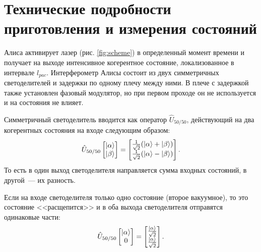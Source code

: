 \section[Технические подробности]{Технические подробности приготовления и измерения состояний}
Алиса активирует лазер (рис. \ref{fig:scheme}) в определенный момент времени и получает на выходе интенсивное когерентное состояние, локализованное в интервале $l_{pac}$. 
Интерферометр Алисы состоит из двух симметричных светоделителей и задержки по одному плечу между ними. В плече с задержкой также установлен фазовый модулятор, но при первом проходе он не используется и на состояния не влияет. 

Симметричный светоделитель вводится как оператор $\hat{U}_{50/50}$, действующий на два когерентных состояния на входе следующим образом:
\begin{equation}
  \hat{U}_{50/50} 
  \begin{bmatrix}
    \left| \alpha \right\rangle \\
    \left| \beta \right\rangle
  \end{bmatrix}
  =
  \begin{bmatrix}
    \frac{1}{\sqrt{2}}(\left| \alpha \right\rangle+\left| \beta \right\rangle) \\
    \frac{1}{\sqrt{2}}(\left| \alpha \right\rangle-\left| \beta \right\rangle)
  \end{bmatrix}.
\end{equation}
То есть в один выход светоделителя направляется сумма входных состояний, в другой~--- их разность.

Если на входе светоделителя только одно состояние (второе вакуумное), то это состояние <<расщепится>> и в оба выхода светоделителя отправятся одинаковые части:
\begin{equation}
  \hat{U}_{50/50} 
  \begin{bmatrix}
    \left| \alpha \right\rangle \\
    0
  \end{bmatrix}
  =
  \begin{bmatrix}
    \frac{\left| \alpha \right\rangle}{\sqrt{2}} \\
    \frac{\left| \alpha \right\rangle}{\sqrt{2}}
  \end{bmatrix}.
\end{equation}

